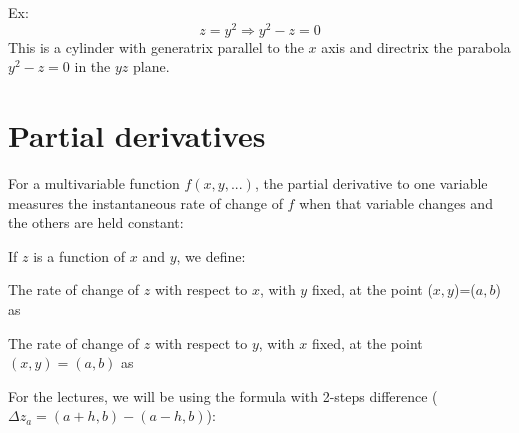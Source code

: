 \documentclass{article}
\begin{document}
Ex:
\[ z = y^2 \Longrightarrow y^2 - z = 0 \]
This is a cylinder with generatrix parallel to the $x$ axis and directrix the
parabola $y^2 - z = 0$ in the $yz$ plane.

\begin{center}
\end{center}

\newpage
\part{Partial derivatives}
For a multivariable function $f(x,y,...)$, the partial derivative to
one variable measures the instantaneous rate of change of $f$ when
that variable changes and the others are held constant:


If $z$ is a function of $x$ and $y$, we define:

The rate of change of $z$ with respect to $x$, with $y$ fixed, at the
point ($x,y$)=($a,b$) as

The rate of change of $z$ with respect to $y$, with $x$ fixed, at the
point $(x,y)=(a,b)$ as

For the lectures, we will be using the formula with 2-steps difference ($\Delta z_a = (a+h,b)-(a-h,b)$):
\end{document}
